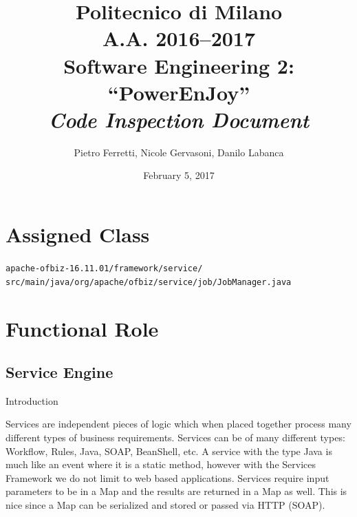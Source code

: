 \documentclass[english]{article}
\begin{document}
\title{Politecnico di Milano\\
 A.A. 2016–2017 \\
Software Engineering 2: “PowerEnJoy” \\
\emph{\textbf{Code Inspection Document}}}

\author{Pietro Ferretti, Nicole Gervasoni, Danilo Labanca}
\date{February 5, 2017}
\maketitle

\newpage

\tableofcontents{}

\newpage

\section{Assigned Class}

\texttt{apache-ofbiz-16.11.01/framework/service/\\
\hspace*{1cm}src/main/java/org/apache/ofbiz/service/job/JobManager.java}

\section{Functional Role}%

\subsection{Service Engine}
Introduction

Services are independent pieces of logic which when placed together process many different types of business requirements. Services can be of many different types: Workflow, Rules, Java, SOAP, BeanShell, etc. A service with the type Java is much like an event where it is a static method, however with the Services Framework we do not limit to web based applications. Services require input parameters to be in a Map and the results are returned in a Map as well. This is nice since a Map can be serialized and stored or passed via HTTP (SOAP).
\end{document}
